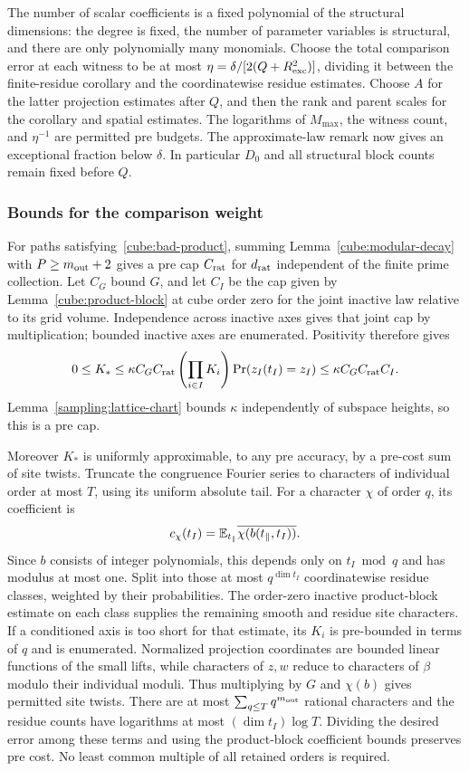 The number of scalar coefficients is a fixed polynomial of the
structural dimensions: the degree is fixed, the number of parameter
variables is structural, and there are only polynomially many
monomials.  Choose the total comparison error at each witness to be
at most $\eta=\delta/[2(Q+R_{\rm exc}^2)]$, dividing it between the
finite-residue corollary and the coordinatewise residue estimates.
Choose $A$ for the latter projection estimates after $Q$, and then
the rank and parent scales for the corollary and spatial estimates.
The logarithms of $M_{\max}$, the witness count, and $\eta^{-1}$
are permitted pre budgets.  The approximate-law remark now gives
an exceptional fraction below $\delta$.  In particular $D_0$ and all
structural block counts remain fixed before $Q$.

\subsubsection{Bounds for the comparison weight}

For paths satisfying~\eqref{cube:bad-product}, summing
Lemma~\ref{cube:modular-decay} with $P\ge m_{\rm out}+2$ gives a
pre cap $C_{\rm rat}$ for $d_{\rm rat}$ independent of the finite
prime collection.  Let $C_G$ bound $G$, and let $C_I$ be the cap
given by Lemma~\ref{cube:product-block} at cube order zero for the
joint inactive law relative to its grid volume.  Independence
across inactive axes gives that joint cap by multiplication; bounded
inactive axes are enumerated.  Positivity therefore gives
\[
 0\le K_*\le \kappa C_G C_{\rm rat}
       \left(\prod_{i\in I}K_i\right)\Pr(z_I(t_I)=z_I)
       \le\kappa C_G C_{\rm rat}C_I.
\]
Lemma~\ref{sampling:lattice-chart} bounds $\kappa$ independently of
subspace heights, so this is a pre cap.

Moreover $K_*$ is uniformly approximable, to any pre accuracy,
by a pre-cost sum of site twists.  Truncate the congruence Fourier
series to characters of individual order at most $T$, using its
uniform absolute tail.  For a character $\chi$ of order $q$, its
coefficient is
\[
 c_\chi(t_I)=\mathbb E_{t_\parallel}
                  \overline{\chi(b(t_\parallel,t_I))}.
\]
Since $b$ consists of integer polynomials, this depends only on
$t_I\bmod q$ and has modulus at most one.  Split into those at most
$q^{\dim t_I}$ coordinatewise residue classes, weighted by their
probabilities.  The order-zero inactive product-block estimate on
each class supplies the remaining smooth and residue site
characters.  If a conditioned axis is too short for that estimate,
its $K_i$ is pre-bounded in terms of $q$ and is enumerated.
Normalized projection coordinates are bounded linear functions of
the small lifts, while characters of $z,w$ reduce to characters of
$\beta$ modulo their individual moduli.  Thus multiplying by $G$
and $\chi(b)$ gives permitted site twists.  There are at most
$\sum_{q\le T}q^{m_{\rm out}}$ rational characters and the residue
counts have logarithms at most $(\dim t_I)\log T$.  Dividing the
desired error among these terms and using the product-block
coefficient bounds preserves pre cost.  No least common multiple
of all retained orders is required.

